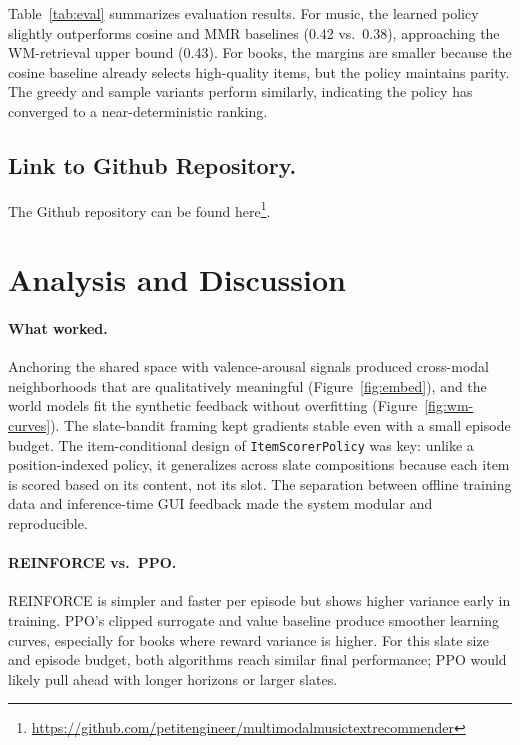 \documentclass[11pt]{article}
\begin{document}
Table~\ref{tab:eval} summarizes evaluation results. For music, the
learned policy slightly outperforms cosine and MMR baselines (0.42
vs.\ 0.38), approaching the WM-retrieval upper bound (0.43). For books,
the margins are smaller because the cosine baseline already selects
high-quality items, but the policy maintains parity. The greedy and
sample variants perform similarly, indicating the policy has converged
to a near-deterministic ranking.

\subsection{Link to Github Repository.}
The Github repository can be found here\footnote{\url{https://github.com/petitengineer/multimodalmusictextrecommender}}.

\section{Analysis and Discussion}
\label{sec:discussion}

\paragraph{What worked.}
Anchoring the shared space with valence-arousal signals produced
cross-modal neighborhoods that are qualitatively meaningful
(Figure~\ref{fig:embed}), and the world models fit the synthetic
feedback without overfitting (Figure~\ref{fig:wm-curves}). The
slate-bandit framing kept gradients stable even with a small episode
budget. The item-conditional design of \texttt{ItemScorerPolicy} was
key: unlike a position-indexed policy, it generalizes across slate
compositions because each item is scored based on its content, not its
slot. The separation between offline training data and inference-time
GUI feedback made the system modular and reproducible.

\paragraph{REINFORCE vs.\ PPO.}
REINFORCE is simpler and faster per episode but shows higher variance
early in training. PPO's clipped surrogate and value baseline produce
smoother learning curves, especially for books where reward variance is
higher. For this slate size and episode budget, both algorithms reach
similar final performance; PPO would likely pull ahead with longer
horizons or larger slates.
\end{document}
